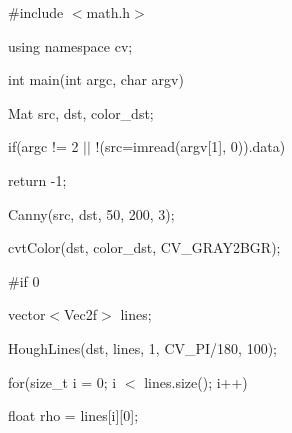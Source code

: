 {\ttfamily }

{\ttfamily }

{\ttfamily \#include $<$math.\+h$>$}

{\ttfamily }

{\ttfamily }

{\ttfamily using namespace cv;}

{\ttfamily }

{\ttfamily }

{\ttfamily int main(int argc, char argv)}

{\ttfamily }

{\ttfamily }

{\ttfamily Mat src, dst, color\+\_\+dst;}

{\ttfamily }

{\ttfamily }

{\ttfamily if(argc != 2 $\vert$$\vert$ !(src=imread(argv\mbox{[}1\mbox{]}, 0)).data)}

{\ttfamily }

{\ttfamily }

{\ttfamily return -\/1;}

{\ttfamily }

{\ttfamily }

{\ttfamily Canny(src, dst, 50, 200, 3);}

{\ttfamily }

{\ttfamily }

{\ttfamily cvt\+Color(dst, color\+\_\+dst, C\+V\+\_\+\+G\+R\+A\+Y2\+B\+G\+R);}

{\ttfamily }

{\ttfamily }

{\ttfamily \#if 0}

{\ttfamily }

{\ttfamily }

{\ttfamily vector$<$\+Vec2f$>$ lines;}

{\ttfamily }

{\ttfamily }

{\ttfamily Hough\+Lines(dst, lines, 1, C\+V\+\_\+\+P\+I/180, 100);}

{\ttfamily }

{\ttfamily }

{\ttfamily for(size\+\_\+t i = 0; i $<$ lines.\+size(); i++)}

{\ttfamily }

{\ttfamily }

{\ttfamily float rho = lines\mbox{[}i\mbox{]}\mbox{[}0\mbox{]};}

{\ttfamily }

